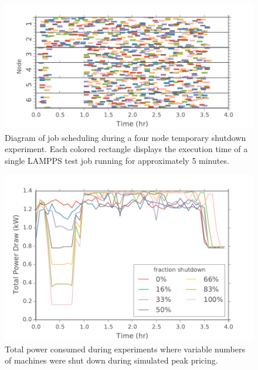 \documentclass[letterpaper,twocolumn,10pt]{article}
\begin{document}
\begin{figure}[t]
	\begin{center}
		\includegraphics[scale=0.55]{usage_viz4}
	\end{center}
	\caption{Diagram of job scheduling during a four node temporary shutdown experiment. Each colored rectangle displays the execution time of a single LAMPPS test job running for approximately 5 minutes.}
	
\end{figure}

\begin{figure}[t]
	\begin{center}
		\includegraphics[scale=0.55]{power_viz}
	\end{center}
	\caption{Total power consumed during experiments where variable numbers of machines were shut down during simulated peak pricing.}
	\label{power_viz}
\end{figure}
\end{document}
